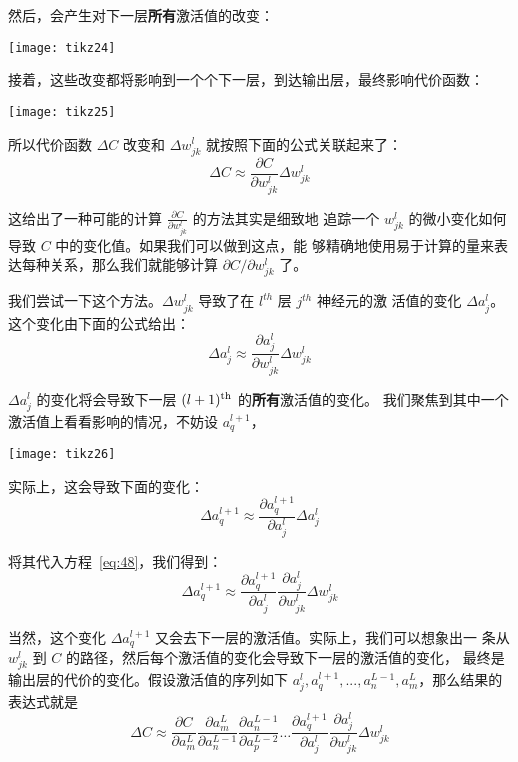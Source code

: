 然后，会产生对下一层\textbf{所有}激活值的改变：

\begin{center}
  \texttt{[image: tikz24]}
\end{center}

接着，这些改变都将影响到一个个下一层，到达输出层，最终影响代价函数：

\begin{center}
  \texttt{[image: tikz25]}
\end{center}

所以代价函数 $\Delta C$ 改变和 $\Delta w_{jk}^l$ 就按照下面的公式关联起来了：
\begin{equation}
  \Delta C \approx \frac{\partial C}{\partial w^l_{jk}} \Delta w^l_{jk}
  \label{eq:47}\tag{47}
\end{equation}

这给出了一种可能的计算 $\frac{\partial C}{\partial w_{jk}^l}$ 的方法其实是细致地
追踪一个 $w_{jk}^l$ 的微小变化如何导致 $C$ 中的变化值。如果我们可以做到这点，能
够精确地使用易于计算的量来表达每种关系，那么我们就能够计算 $\partial C /
\partial w^l_{jk}$ 了。

我们尝试一下这个方法。$\Delta w_{jk}^l$ 导致了在 $l^{th}$ 层 $j^{th}$ 神经元的激
活值的变化 $\Delta a_j^l$。这个变化由下面的公式给出：
\begin{equation}
  \Delta a^l_j \approx \frac{\partial a^l_j}{\partial w^l_{jk}} \Delta w^l_{jk}
  \label{eq:48}\tag{48}
\end{equation}

$\Delta a_j^l$ 的变化将会导致下一层 $(l+1)^{\rm th}$ 的\textbf{所有}激活值的变化。
我们聚焦到其中一个激活值上看看影响的情况，不妨设 $a_q^{l+1}$，

\begin{center}
  \texttt{[image: tikz26]}
\end{center}

实际上，这会导致下面的变化：
\begin{equation}
  \Delta a^{l+1}_q \approx \frac{\partial a^{l+1}_q}{\partial a^l_j} \Delta
  a^l_j
  \label{eq:49}\tag{49}
\end{equation}

将其代入方程~\eqref{eq:48}，我们得到：
\begin{equation}
  \Delta a^{l+1}_q \approx \frac{\partial a^{l+1}_q}{\partial a^l_j}
  \frac{\partial a^l_j}{\partial w^l_{jk}} \Delta w^l_{jk}
  \label{eq:50}\tag{50}
\end{equation}

当然，这个变化 $\Delta a^{l+1}_q$ 又会去下一层的激活值。实际上，我们可以想象出一
条从 $w_{jk}^l$ 到 $C$ 的路径，然后每个激活值的变化会导致下一层的激活值的变化，
最终是输出层的代价的变化。假设激活值的序列如下 $a_j^l, a_q^{l+1},
...,a_n^{L-1},a_m^{L}$，那么结果的表达式就是
\begin{equation}
  \Delta C \approx \frac{\partial C}{\partial a^L_m}
  \frac{\partial a^L_m}{\partial a^{L-1}_n}
  \frac{\partial a^{L-1}_n}{\partial a^{L-2}_p} \ldots
  \frac{\partial a^{l+1}_q}{\partial a^l_j}
  \frac{\partial a^l_j}{\partial w^l_{jk}} \Delta w^l_{jk}
  \label{eq:51}\tag{51}
\end{equation}

